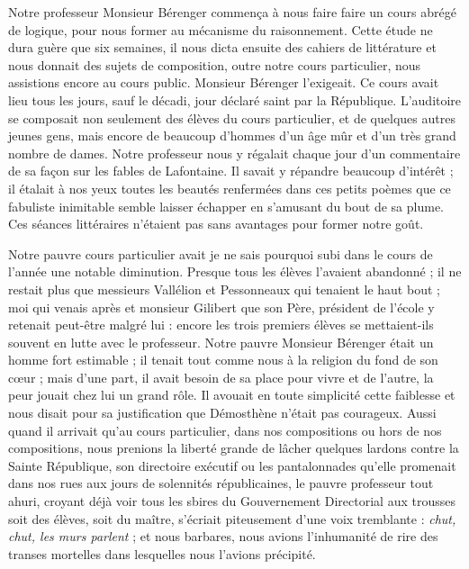 \documentclass[11pt,a4paper]{report}
\begin{document}
Notre professeur Monsieur Bérenger commença à nous faire faire un cours abrégé de logique, pour nous former au mécanisme du raisonnement. Cette étude ne dura guère que six semaines, il nous dicta ensuite des cahiers de littérature et nous donnait des sujets de composition, outre notre cours particulier, nous assistions encore au cours public. Monsieur Bérenger l'exigeait. Ce cours avait lieu tous les jours, sauf le décadi, jour déclaré saint par la République. L'auditoire se composait non seulement des élèves du cours particulier, et de quelques autres jeunes gens, mais encore de beaucoup d'hommes d'un âge mûr et d'un très grand nombre de dames. Notre professeur nous y régalait chaque jour d'un commentaire de sa façon sur les fables de Lafontaine. Il savait y répandre beaucoup d'intérêt ; il étalait à nos yeux toutes les beautés renfermées dans ces petits poèmes que ce fabuliste inimitable semble laisser échapper en s'amusant du bout de sa plume. Ces séances littéraires n'étaient pas sans avantages pour former notre goût.

Notre pauvre cours particulier avait je ne sais pourquoi subi dans le cours de l'année une notable diminution. Presque tous les élèves l'avaient abandonné ; il ne restait plus que messieurs Vallélion et Pessonneaux qui tenaient le haut bout ; moi qui venais après et monsieur Gilibert que son Père, président de l'école y retenait peut-être malgré lui : encore les trois premiers élèves se mettaient-ils souvent en lutte avec le professeur. Notre pauvre Monsieur Bérenger était un homme fort estimable ; il tenait tout comme nous à la religion du fond de son cœur ; mais d'une part, il avait besoin de sa place pour vivre et de l'autre, la peur jouait chez lui un grand rôle. Il avouait en toute simplicité cette faiblesse et nous disait pour sa justification que Démosthène n'était pas courageux. Aussi quand il arrivait qu'au cours particulier, dans nos compositions ou hors de nos compositions, nous prenions la liberté grande de lâcher quelques lardons contre la Sainte République, son directoire exécutif ou les pantalonnades qu'elle promenait dans nos rues aux jours de solennités républicaines, le pauvre professeur tout ahuri, croyant déjà voir tous les sbires du Gouvernement Directorial aux trousses soit des élèves, soit du maître, s'écriait piteusement d'une voix tremblante : \textit{chut, chut, les murs parlent} ; et nous barbares, nous avions l'inhumanité de rire des transes mortelles dans lesquelles nous l'avions précipité.
\end{document}
